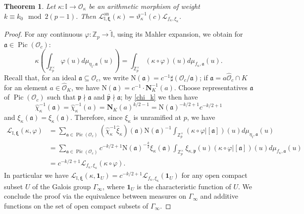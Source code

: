 \documentclass[a4paper,11pt]{amsart}
\numberwithin{equation}{section}
\theoremstyle{plain}
\newtheorem{theorem}{Theorem}[section]
\theoremstyle{definition}
\theoremstyle{remark}
\newcommand{\Z}{\mathbb{Z}}
\newcommand{\I}{\mathbb{I}}
\DeclareMathOperator{\Pic}{Pic}
\begin{document}
\begin{theorem}\label{mainthh}
Let $\kappa\colon\I\rightarrow\mathcal{O}_\kappa$ be an arithmetic morphism of weight $k \equiv k_0 \mod 2(p-1)$. 
Then 
$\mathscr{L}_{\I,\boldsymbol\xi}^{\mathrm{an}}(\kappa )=
\vartheta^{-1}_\kappa (c) \mathscr{L}_{f_\kappa ,\xi_\kappa }$.
\end{theorem}

\begin{proof} 
For any continuous $\varphi\colon \Z_p \to \widetilde{\I}$, using its Mahler expansion, we obtain for $\mathfrak{a} \in \Pic(\mathcal{O}_c)$:
\[
\kappa \left(\int_{\Z_p^\times} \varphi(u) d{\mu_{\eta_\I,\mathfrak{a}}}(u)\right) = \int_{\Z_p^\times}(\kappa  \circ \varphi)(u) d{\mu_{f_\kappa ,\mathfrak{a}}}(u).
\]
Recall that, for an ideal $\mathfrak{a}\subseteq\mathcal{O}_c$, we write $\mathrm{N}(\mathfrak{a})=c^{-1}\sharp(\mathcal{O}_c/\mathfrak{a})$; if $\mathfrak{a}=a\widehat{\mathcal{O}}_c\cap K$ for an element $a\in\widehat{\mathcal{O}}_K$,
we have 
$\mathrm{N}(\mathfrak{a})=c^{-1}\cdot\mathbf{N}^{-1}_K(a)$.  
Choose representatives $\mathfrak{a}$ of  $\Pic(\mathcal{O}_c)$ such that 
$\mathfrak{p}\nmid \mathfrak{a}$
and $\bar{\mathfrak{p}}\nmid \mathfrak{a}$; by \eqref{chi_k} we then have  
\[
\hat{\chi}^{-1}_\kappa (\mathfrak{a})= \hat{\chi}^{-1}_\kappa(a) = \mathbf{N}_K(a)^{k /2-1} = \mathrm{N}(\mathfrak{a})^{-k /2+1} c^{-k/2+1}
\]
and $\xi_\kappa(\mathfrak{a})=\hat{\xi}_\kappa(\mathfrak{a})$. 
Therefore, since $\xi_\kappa$ is unramified at $p$, we have 
	\begin{equation*}
	\begin{split}
\mathscr{L}_{\I,\boldsymbol\xi}(\kappa,\varphi) &= \sum_{\mathfrak{a} \in \Pic(\mathcal O_{c})}
({\hat{\chi}}_\kappa ^{-1}
{\hat{\xi}}_\kappa )(\mathfrak{a})
\mathrm{N}(\mathfrak{a})^{-1}
\int_{\Z_p^{\times}}
(\kappa\circ\varphi \big|[\mathfrak{a}])(u)d\mu_{\eta_\I,\mathfrak{a}}(u)\\
&= \sum_{\mathfrak{a} \in \Pic(\mathcal{O}_{c})}c^{-k/2+1} \mathrm{N}(\mathfrak{a})^{-\frac{k}{2}}{\xi}_\kappa (\mathfrak{a}) \int_{\Z_p^{\times}} \xi_{\kappa ,\mathfrak{p}}(u)(\kappa  \circ \varphi \big|[\mathfrak{a}])(u)d\mu_{f_\kappa ,\mathfrak{a}}(u)
\\
&=c^{-k/2+1} \mathscr{L}_{f_\kappa ,\xi_\kappa}(\kappa \circ \varphi).
\end{split}
\end{equation*}
In particular we have 
$\mathscr{L}_{\I,\boldsymbol\xi}(\kappa ,\mathbf{1}_U) = c^{-k /2+1} \mathscr{L}
_{f_\kappa ,\xi_\kappa }(\mathbf{1}_U)$
for any open compact subset $U$ of the Galois group  $\Gamma_\infty$, where $\mathbf{1}_U$ is the characteristic function of $U$. We conclude the proof via the equivalence between measures on $\Gamma_\infty$ and additive functions on the set of open compact subsets of $\Gamma_\infty$.
\end{proof}
\end{document}
